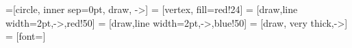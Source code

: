 \documentclass[a4paper,12pt]{article}
\begin{document}
	=[circle, inner sep=0pt, draw, ->]
	 = [vertex, fill=red!24]
	 = [draw,line width=2pt,->,red!50]
	 = [draw,line width=2pt,->,blue!50]
	 = [draw, very thick,->]
	 = [font=\small]

			

\end{document}
